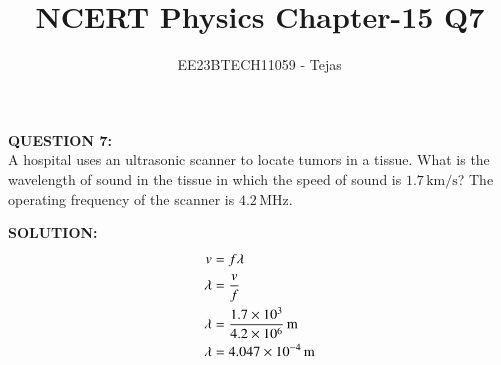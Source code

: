 \documentclass[journal,12pt,twocolumn]{IEEEtran}
\theoremstyle{remark}
\begin{document}


\vspace{3cm}

\title{NCERT Physics Chapter-15 Q7}
\author{EE23BTECH11059 - Tejas$^{}$}
\maketitle

\newpage

\Huge \textbf{QUESTION 7:} \\

\medskip
\Large
A hospital uses an ultrasonic scanner to locate tumors in a tissue. What is the
wavelength of sound in the tissue in which the speed of sound is $1.7 \, \text{km/s}$? The operating frequency of the scanner is $4.2 \, \text{MHz}$.

\bigskip
\Large
\textbf{SOLUTION:} \\

\begin{align}
v &= f \lambda \notag \\
\lambda &= \frac{v}{f} \notag \\
\lambda &= \frac{1.7 \times 10^3}{4.2 \times 10^6} \, \text{m} \notag \\
\lambda &= 4.047 \times 10^{-4} \, \text{m}
\end{align}



        
        
        
             
             
        

        













\renewcommand{\thefigure}{\theenumi}
\renewcommand{\thetable}{\theenumi}
\end{document}
